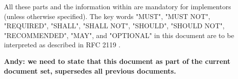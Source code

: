 All these parts and the information within are mandatory for
implementors (unless otherwise specified). The key words "MUST", "MUST
NOT", "REQUIRED", "SHALL", "SHALL NOT", "SHOULD", "SHOULD NOT",
"RECOMMENDED", "MAY", and "OPTIONAL" in this document are to be
interpreted as described in RFC 2119 \cite{rfc2119}.

\textbf{Andy: we need to state that this document as part of the current document set,
supersedes all previous documents.}

